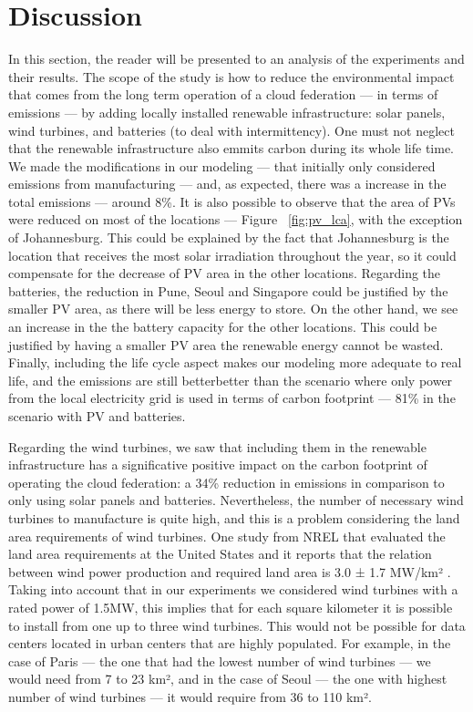 

\section{Discussion}
\label{sec:long_term_discussion}

In this section, the reader will be presented to an analysis of the experiments and their results. The scope of the study is how to reduce the environmental impact that comes from the long term operation of a cloud federation --- in terms of  emissions --- by adding locally installed renewable infrastructure: solar panels, wind turbines, and batteries (to deal with intermittency). One must not neglect that the renewable infrastructure also emmits carbon during its whole life time. We made the modifications in our modeling --- that initially only considered emissions from manufacturing --- and, as expected, there was a increase in the total emissions --- around 8\%. It is also possible to observe that the area of PVs were reduced on most of the locations --- Figure ~\ref{fig:pv_lca}, with the exception of Johannesburg. This could be explained by the fact that Johannesburg is the location that receives the most solar irradiation throughout the year, so it could compensate for the decrease of PV area in the other locations. Regarding the batteries, the reduction in Pune, Seoul and Singapore could be justified by the smaller PV area, as there will be less energy to store. On the other hand, we see an increase in the the battery capacity for the other locations. This could be justified by having a smaller PV area the renewable energy cannot be wasted. Finally, including the life cycle aspect makes our modeling more adequate to real life, and the emissions are still betterbetter than the scenario where only power from the local electricity grid is used in terms of carbon footprint --- 81\% in the scenario with PV and batteries.  

Regarding the wind turbines, we saw that including them in the renewable infrastructure has a significative positive impact on the carbon footprint of operating the cloud federation: a 34\% reduction in  emissions in comparison to only using solar panels and batteries. Nevertheless, the number of necessary wind turbines to manufacture is quite high, and this is a problem considering the land area requirements of wind turbines. One study from NREL that evaluated the land area requirements at the United States and it reports that the relation between wind power production and required land area is 3.0 ± 1.7 MW/km² \cite{wtlanduse_2009}. Taking into account that in our experiments we considered wind turbines with a rated power of 1.5MW, this implies that for each square kilometer it is possible to install from one up to three wind turbines. This would not be possible for data centers located in urban centers that are highly populated. For example, in the case of Paris --- the one that had the lowest number of wind turbines --- we would need from 7 to 23 km², and in the case of Seoul --- the one with highest number of wind turbines --- it would require from 36 to 110 km².

